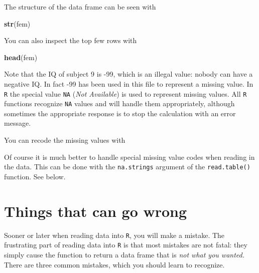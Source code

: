 \documentclass[
]{book}
\newenvironment{Shaded}{\begin{snugshade}}{\end{snugshade}}
\newcommand{\ConstantTok}[1]{\textcolor[rgb]{0.56,0.35,0.01}{#1}}
\newcommand{\DecValTok}[1]{\textcolor[rgb]{0.00,0.00,0.81}{#1}}
\newcommand{\FunctionTok}[1]{\textcolor[rgb]{0.13,0.29,0.53}{\textbf{#1}}}
\newcommand{\NormalTok}[1]{#1}
\newcommand{\OtherTok}[1]{\textcolor[rgb]{0.56,0.35,0.01}{#1}}
\newcommand{\SpecialCharTok}[1]{\textcolor[rgb]{0.81,0.36,0.00}{\textbf{#1}}}
\begin{document}
The structure of the data frame can be seen with

\begin{Shaded}
\begin{Highlighting}[]
\FunctionTok{str}\NormalTok{(fem)}
\end{Highlighting}
\end{Shaded}

You can also inspect the top few rows with

\begin{Shaded}
\begin{Highlighting}[]
\FunctionTok{head}\NormalTok{(fem)}
\end{Highlighting}
\end{Shaded}

Note that the IQ of subject 9 is -99, which is an illegal value:
nobody can have a negative IQ. In fact -99 has been used in this file
to represent a missing value. In \texttt{R} the special value
\texttt{NA} (\emph{Not Available}) is used to represent missing values. All
\texttt{R} functions recognize \texttt{NA} values and will handle them
appropriately, although sometimes the appropriate response is to stop
the calculation with an error message.

You can recode the missing values with

\begin{Shaded}
\end{Shaded}

Of course it is much better to handle special missing value codes
when reading in the data. This can be done with the
\texttt{na.strings} argument of the \texttt{read.table()}
function. See below.

\section{Things that can go wrong}\label{things-that-can-go-wrong}

Sooner or later when reading data into \texttt{R}, you will make a
mistake. The frustrating part of reading data into \texttt{R} is that
most mistakes are not fatal: they simply cause the function to return
a data frame that is \emph{not what you wanted.} There are three
common mistakes, which you should learn to recognize.
\end{document}
